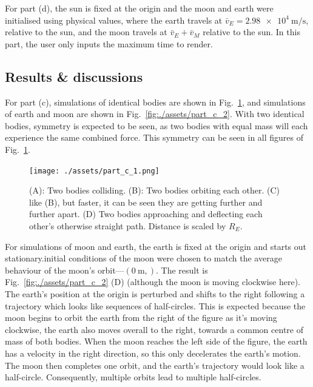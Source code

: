 \documentclass[hyphens,twocolumn,nobalancelastpage,aps,10pt,citeautoscript,longbibliography]{revtex4-2}
\begin{document}
For part (d), the sun is fixed at the origin and the moon and earth were
initialised using physical values, where the earth travels at $\bar{v}_E =
\qty{2.98e4}{\metre\per\second}$, relative to the sun, and the moon travels at
$\bar{v}_E + \bar{v}_M$ relative to the sun. In this part, the user only inputs
the maximum time to render.

\subsection{Results \& discussions}%
\label{sub:results_and_discussions_2}

\noindent For part (c), simulations of identical bodies are shown in
Fig.~\ref{fig:./assets/part_c_1}, and simulations of earth and moon are shown
in Fig.~\ref{fig:./assets/part_c_2}. With two identical bodies, symmetry is
expected to be seen, as two bodies with equal mass will each experience the
same combined force. This symmetry can be seen in all figures of
Fig.~\ref{fig:./assets/part_c_1}.

\begin{figure}[htpb]
	\centering
	\texttt{[image: ./assets/part\_c\_1.png]}
	\caption{(A): Two bodies colliding. (B): Two bodies orbiting each other.
	(C) like (B), but faster, it can be seen they are getting further and
	further apart. (D) Two bodies approaching and deflecting each other's
	otherwise straight path. Distance is scaled by $R_E$.}%
	\label{fig:./assets/part_c_1}
\end{figure}

For simulations of moon and earth, the earth is fixed at the origin and starts
out stationary.initial conditions of the moon were chosen to match the average
behaviour of the moon's orbit---$(\qty{0}{\metre}, )$. The result is
Fig.~\ref{fig:./assets/part_c_2} (D) (although the moon is moving clockwise
here). The earth's position at the origin is perturbed and shifts to the right
following a trajectory which looks like sequences of half-circles. This is
expected because the moon begins to orbit the earth from the right of the
figure as it's moving clockwise, the earth also moves overall to the right,
towards a common centre of mass of both bodies. When the moon reaches the left
side of the figure, the earth has a velocity in the right direction, so this
only decelerates the earth's motion. The moon then completes one orbit, and the
earth's trajectory would look like a half-circle. Consequently, multiple orbits
lead to multiple half-circles.
\end{document}
